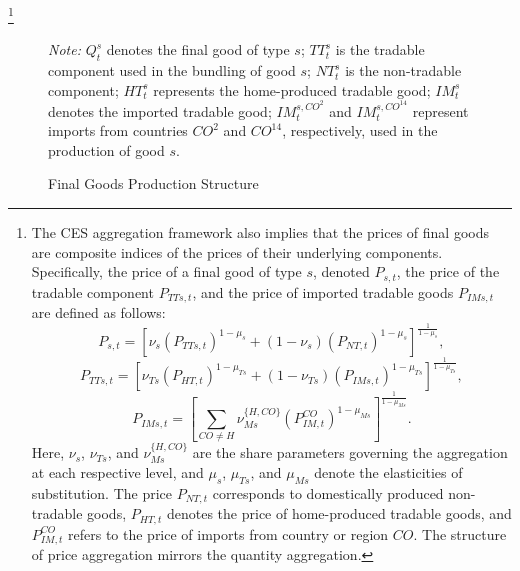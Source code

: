 \documentclass[a4paper,11pt]{article}
\newcommand{\desc}[1]{\vspace{0mm} \footnotesize \begin{minipage}{0.9\textwidth} \emph{Note: }{#1} \end{minipage}}
\numberwithin{equation}{section}
\begin{document}
\footnote{
    The CES aggregation framework also implies that the prices of final goods are composite indices of the prices of their underlying components. 
    Specifically, the price of a final good of type $s$, denoted $P_{s,t}$, the price of the tradable component $P_{TTs,t}$, and the price of imported tradable goods $P_{IMs,t}$ are defined as follows:
    \[ P_{s,t} = \left[\nu_s\left(P_{TTs,t}\right)^{1-\mu_s} + \left(1-\nu_s\right)\left(P_{NT,t}\right)^{1-\mu_s}\right]^{\frac{1}{1-\mu_s}}, \] 
    \[ P_{TTs,t} = \left[\nu_{Ts}\left(P_{HT,t}\right)^{1-\mu_{Ts}} + \left(1-\nu_{Ts}\right)\left(P_{IMs,t}\right)^{1-\mu_{Ts}}\right]^{\frac{1}{1-\mu_{Ts}}}, \]
    \[ P_{IMs,t} = \left[\sum_{CO \neq H} \nu_{Ms}^{\{H,CO\}}\left(P_{IM,t}^{CO}\right)^{1-\mu_{Ms}}\right]^{\frac{1}{1-\mu_{Ms}}}. \]
    Here, $\nu_s$, $\nu_{Ts}$, and $\nu_{Ms}^{\{H,CO\}}$ are the share parameters governing the aggregation at each respective level, and $\mu_s$, $\mu_{Ts}$, and $\mu_{Ms}$ denote the elasticities of substitution. 
    The price $P_{NT,t}$ corresponds to domestically produced non-tradable goods, $P_{HT,t}$ denotes the price of home-produced tradable goods, and $P_{IM,t}^{CO}$ refers to the price of imports from country or region $CO$. 
    The structure of price aggregation mirrors the quantity aggregation.
}

\begin{figure}[H]
    \centering
    \caption{Final Goods Production Structure \label{fig:finalGoodProduction}}
    
    \desc{$Q_t^s$ denotes the final good of type $s$; $TT_t^s$ is the tradable component used in the bundling of good $s$; $NT_t^s$ is the non-tradable component; $HT_t^s$ represents the home-produced tradable good; $IM_t^s$ denotes the imported tradable good; $IM_t^{s,CO^2}$ and $IM_t^{s,CO^{14}}$ represent imports from countries $CO^2$ and $CO^{14}$, respectively, used in the production of good $s$.}
\end{figure}
\end{document}

